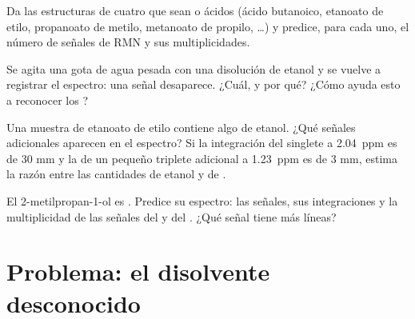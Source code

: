 \begin{exercise}[$\star\star\star$]\label{exo:g12:proton-nmr:12}
Da las estructuras de cuatro   que sean  o
ácidos (ácido butanoico, etanoato de etilo, propanoato de metilo,
metanoato de propilo, \dots) y predice, para cada uno, el número de
señales de RMN y sus multiplicidades.
\end{exercise}

\begin{exercise}[$\star\star\star$]\label{exo:g12:proton-nmr:13}
Se agita una gota de agua pesada  con una disolución de etanol y
se vuelve a registrar el espectro: una señal desaparece. ¿Cuál, y por
qué? ¿Cómo ayuda esto a reconocer los  ?
\end{exercise}

\begin{exercise}[$\star\star\star$]\label{exo:g12:proton-nmr:14}
Una muestra de etanoato de etilo contiene algo de etanol. ¿Qué señales
adicionales aparecen en el espectro? Si la integración del singlete a
\qty{2.04}{ppm} es de 30 mm y la de un pequeño triplete adicional a
\qty{1.23}{ppm} es de 3 mm, estima la razón entre las cantidades de
etanol y de .
\end{exercise}

\begin{exercise}[$\star\star\star$]\label{exo:g12:proton-nmr:15}
El 2-metilpropan-1-ol es . Predice su espectro: las
señales, sus integraciones y la multiplicidad de las señales del
 y del . ¿Qué señal tiene más líneas?
\end{exercise}

\section{Problema: el disolvente desconocido}

